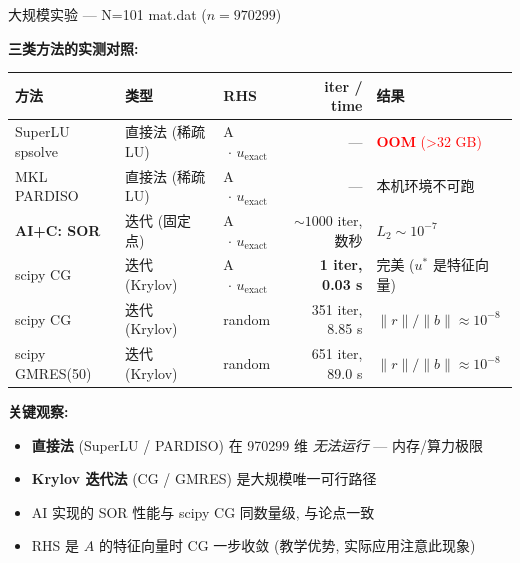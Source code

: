 \documentclass[12pt,aspectratio=169]{beamer}
\begin{document}
\begin{frame}[shrink]{大规模实验 — N=101 mat.dat ($n=970299$)}

\textbf{三类方法的实测对照:}

\vspace{2pt}
\footnotesize
\begin{center}
\renewcommand{\arraystretch}{1.15}
\setlength{\tabcolsep}{4pt}
\begin{tabular}{@{}l l l r l@{}}
\toprule
\textbf{方法}            & \textbf{类型}     & \textbf{RHS}            & \textbf{iter / time} & \textbf{结果} \\
\midrule
SuperLU spsolve         & 直接法 (稀疏 LU)   & A$\,\cdot\,u_{\text{exact}}$ & ---     & \textcolor{red}{\textbf{OOM} (>32 GB)} \\
MKL PARDISO             & 直接法 (稀疏 LU)   & A$\,\cdot\,u_{\text{exact}}$ & ---     & 本机环境不可跑 \\[2pt]
\textbf{AI+C: SOR}      & 迭代 (固定点)     & A$\,\cdot\,u_{\text{exact}}$ & $\sim 1000$ iter, 数秒 & \textbf{$L_2 \sim 10^{-7}$} \\
scipy CG                & 迭代 (Krylov)     & A$\,\cdot\,u_{\text{exact}}$ & \textbf{1 iter, 0.03 s} & 完美 ($u^*$ 是特征向量) \\
scipy CG                & 迭代 (Krylov)     & random                  & 351 iter, 8.85 s    & $\|r\|/\|b\| \approx 10^{-8}$ \\
scipy GMRES(50)         & 迭代 (Krylov)     & random                  & 651 iter, 89.0 s    & $\|r\|/\|b\| \approx 10^{-8}$ \\
\bottomrule
\end{tabular}
\end{center}
\normalsize

\vspace{4pt}
\textbf{关键观察:}
\begin{itemize}\itemsep1pt
  \item \textbf{直接法} (SuperLU / PARDISO) 在 970299 维 \emph{无法运行} — 内存/算力极限
  \item \textbf{Krylov 迭代法} (CG / GMRES) 是大规模唯一可行路径
  \item AI 实现的 SOR 性能与 scipy CG 同数量级, 与论点一致
  \item RHS 是 $A$ 的特征向量时 CG 一步收敛 (教学优势, 实际应用注意此现象)
\end{itemize}
\end{frame}
\end{document}
